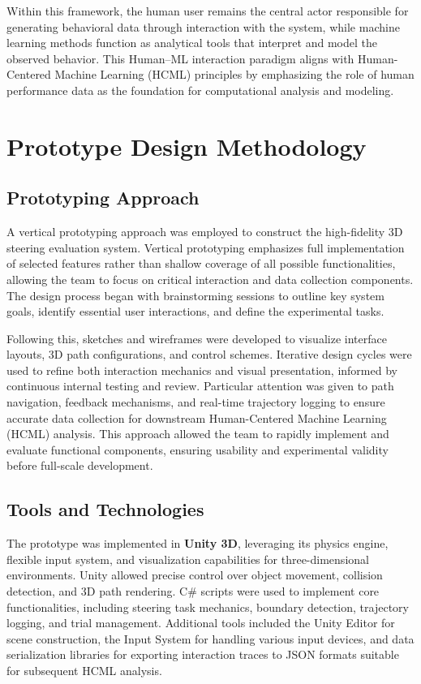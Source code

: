 \documentclass[sigconf]{acmart}
\begin{document}
Within this framework, the human user remains the central actor responsible for generating behavioral data through interaction with the system, while machine learning methods function as analytical tools that interpret and model the observed behavior. This Human--ML interaction paradigm aligns with Human-Centered Machine Learning (HCML) principles by emphasizing the role of human performance data as the foundation for computational analysis and modeling.

\section{Prototype Design Methodology}

\subsection{Prototyping Approach}

A vertical prototyping approach was employed to construct the high-fidelity 3D steering evaluation system. Vertical prototyping emphasizes full implementation of selected features rather than shallow coverage of all possible functionalities, allowing the team to focus on critical interaction and data collection components. The design process began with brainstorming sessions to outline key system goals, identify essential user interactions, and define the experimental tasks. 

Following this, sketches and wireframes were developed to visualize interface layouts, 3D path configurations, and control schemes. Iterative design cycles were used to refine both interaction mechanics and visual presentation, informed by continuous internal testing and review. Particular attention was given to path navigation, feedback mechanisms, and real-time trajectory logging to ensure accurate data collection for downstream Human-Centered Machine Learning (HCML) analysis. This approach allowed the team to rapidly implement and evaluate functional components, ensuring usability and experimental validity before full-scale development.

\subsection{Tools and Technologies}

The prototype was implemented in \textbf{Unity 3D}, leveraging its physics engine, flexible input system, and visualization capabilities for three-dimensional environments. Unity allowed precise control over object movement, collision detection, and 3D path rendering. C\# scripts were used to implement core functionalities, including steering task mechanics, boundary detection, trajectory logging, and trial management. Additional tools included the Unity Editor for scene construction, the Input System for handling various input devices, and data serialization libraries for exporting interaction traces to JSON formats suitable for subsequent HCML analysis.
\end{document}
